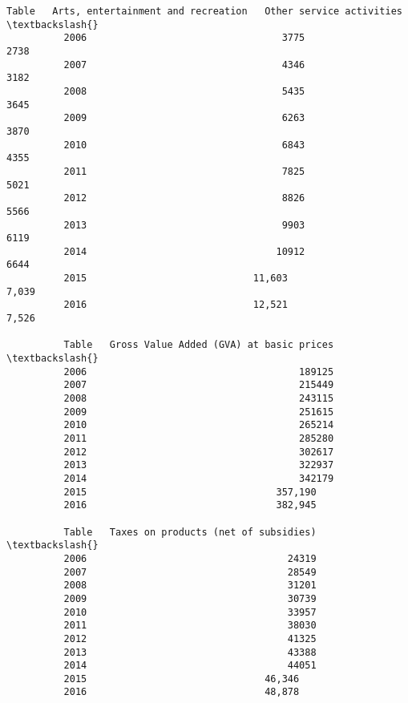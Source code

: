 \documentclass[11pt]{article}
\begin{document}
\begin{Verbatim}[commandchars=\\\{\}]
          Table   Arts, entertainment and recreation   Other service activities  \textbackslash{}
          2006                                  3775                       2738   
          2007                                  4346                       3182   
          2008                                  5435                       3645   
          2009                                  6263                       3870   
          2010                                  6843                       4355   
          2011                                  7825                       5021   
          2012                                  8826                       5566   
          2013                                  9903                       6119   
          2014                                 10912                       6644   
          2015                             11,603                      7,039      
          2016                             12,521                      7,526      
          
          Table   Gross Value Added (GVA) at basic prices  \textbackslash{}
          2006                                     189125   
          2007                                     215449   
          2008                                     243115   
          2009                                     251615   
          2010                                     265214   
          2011                                     285280   
          2012                                     302617   
          2013                                     322937   
          2014                                     342179   
          2015                                 357,190      
          2016                                 382,945      
          
          Table   Taxes on products (net of subsidies)  \textbackslash{}
          2006                                   24319   
          2007                                   28549   
          2008                                   31201   
          2009                                   30739   
          2010                                   33957   
          2011                                   38030   
          2012                                   41325   
          2013                                   43388   
          2014                                   44051   
          2015                               46,346      
          2016                               48,878      
          

\end{Verbatim}
\end{document}
